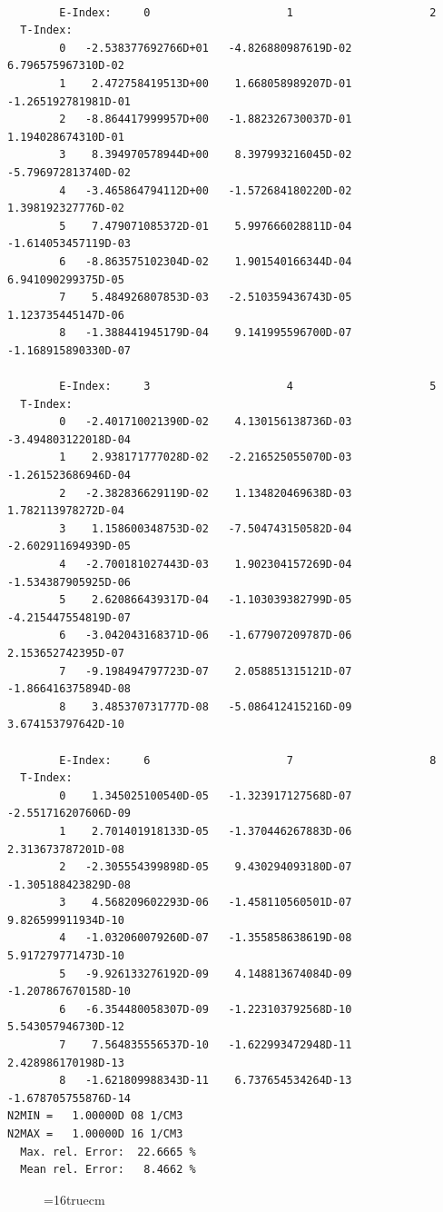 \documentclass[12pt,dvipdfmx]{article}
\begin{document}
\begin{small}\begin{verbatim}

        E-Index:     0                     1                     2
  T-Index:
        0   -2.538377692766D+01   -4.826880987619D-02    6.796575967310D-02
        1    2.472758419513D+00    1.668058989207D-01   -1.265192781981D-01
        2   -8.864417999957D+00   -1.882326730037D-01    1.194028674310D-01
        3    8.394970578944D+00    8.397993216045D-02   -5.796972813740D-02
        4   -3.465864794112D+00   -1.572684180220D-02    1.398192327776D-02
        5    7.479071085372D-01    5.997666028811D-04   -1.614053457119D-03
        6   -8.863575102304D-02    1.901540166344D-04    6.941090299375D-05
        7    5.484926807853D-03   -2.510359436743D-05    1.123735445147D-06
        8   -1.388441945179D-04    9.141995596700D-07   -1.168915890330D-07

        E-Index:     3                     4                     5
  T-Index:
        0   -2.401710021390D-02    4.130156138736D-03   -3.494803122018D-04
        1    2.938171777028D-02   -2.216525055070D-03   -1.261523686946D-04
        2   -2.382836629119D-02    1.134820469638D-03    1.782113978272D-04
        3    1.158600348753D-02   -7.504743150582D-04   -2.602911694939D-05
        4   -2.700181027443D-03    1.902304157269D-04   -1.534387905925D-06
        5    2.620866439317D-04   -1.103039382799D-05   -4.215447554819D-07
        6   -3.042043168371D-06   -1.677907209787D-06    2.153652742395D-07
        7   -9.198494797723D-07    2.058851315121D-07   -1.866416375894D-08
        8    3.485370731777D-08   -5.086412415216D-09    3.674153797642D-10

        E-Index:     6                     7                     8
  T-Index:
        0    1.345025100540D-05   -1.323917127568D-07   -2.551716207606D-09
        1    2.701401918133D-05   -1.370446267883D-06    2.313673787201D-08
        2   -2.305554399898D-05    9.430294093180D-07   -1.305188423829D-08
        3    4.568209602293D-06   -1.458110560501D-07    9.826599911934D-10
        4   -1.032060079260D-07   -1.355858638619D-08    5.917279771473D-10
        5   -9.926133276192D-09    4.148813674084D-09   -1.207867670158D-10
        6   -6.354480058307D-09   -1.223103792568D-10    5.543057946730D-12
        7    7.564835556537D-10   -1.622993472948D-11    2.428986170198D-13
        8   -1.621809988343D-11    6.737654534264D-13   -1.678705755876D-14
N2MIN =   1.00000D 08 1/CM3
N2MAX =   1.00000D 16 1/CM3
  Max. rel. Error:  22.6665 %
  Mean rel. Error:   8.4662 %
\end{verbatim}\end{small}
\begin{figure} \label{2.3.13aer}
\epsfxsize=16truecm
\end{figure}
\newpage
\end{document}
